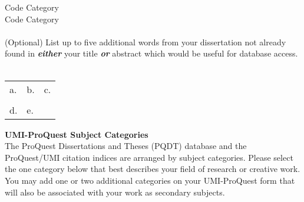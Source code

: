 \documentclass[9pt]{article}
\def\categorytwo{}
\def\codethree{}
\def\categorythree{}
\def\keyworda{}
\def\keywordb{}
\def\keywordc{}
\def\keywordd{}
\def\keyworde{}
\newcommand{\TextFieldDefault}[2][]{%
  \raisebox{\dimexpr\depth-\fontchardp\font`y}{%
    \TextField[bordercolor={},backgroundcolor={},#1]{#2}%
  }%
}
\begin{document}
\begin{Form}
\begin{enumerate}[resume]
  Code \uline{\hspace*{0.125in}\usebox{\tempfieldbox}\hspace*{0.125in}} \qquad
  \sbox{\tempfieldbox}{\TextFieldDefault[value=\categorytwo,name=category 2,width=2.375in,height=\baselineskip]{}}%
  Category \uline{\hspace*{0.125in}\usebox{\tempfieldbox}} \\
  \sbox{\tempfieldbox}{\TextFieldDefault[value=\codethree,name=code 3,width=.75in,height=\baselineskip]{}}%
  Code \uline{\hspace*{0.125in}\usebox{\tempfieldbox}\hspace*{0.125in}} \qquad
  \sbox{\tempfieldbox}{\TextFieldDefault[value=\categorythree,name=category 3,width=2.375in,height=\baselineskip]{}}%
  Category \uline{\hspace*{0.125in}\usebox{\tempfieldbox}} \\
  \\
  (Optional) List up to five additional words from your dissertation not already found in \textbf{\emph{either}} your title \textbf{\emph{or}} abstract
  which would be useful for database access. \\
  \\
  \newlength{\keywordheight}%
  \setlength{\keywordheight}{\baselineskip}%
  \begin{tabular}{lll}
    \sbox{\tempfieldbox}{\TextFieldDefault[value=\keyworda,name=keyword 1,width=1.7in,height=\keywordheight]{}}%
    a. \uline{\usebox{\tempfieldbox}} &
    \sbox{\tempfieldbox}{\TextFieldDefault[value=\keywordb,name=keyword 2,width=1.7in,height=\keywordheight]{}}%
    b. \uline{\usebox{\tempfieldbox}} &
    \sbox{\tempfieldbox}{\TextFieldDefault[value=\keywordc,name=keyword 3,width=1.7in,height=\keywordheight]{}}%
    c. \uline{\usebox{\tempfieldbox}} \\ \\
    \sbox{\tempfieldbox}{\TextFieldDefault[value=\keywordd,name=keyword 4,width=1.7in,height=\keywordheight]{}}%
    d. \uline{\usebox{\tempfieldbox}} &
    \sbox{\tempfieldbox}{\TextFieldDefault[value=\keyworde,name=keyword 5,width=1.7in,height=\keywordheight]{}}%
    e. \uline{\usebox{\tempfieldbox}} &
  \end{tabular}
\end{enumerate}
\end{Form}
\clearpage
{}
\raggedcolumns
\setlength{\parskip}{\baselineskip}
\fancyhf{}
\renewcommand{\headrulewidth}{0pt}
\rfoot{\the\numexpr\thepage-1\relax}
{\large\textbf{UMI-ProQuest Subject Categories}} \\
The ProQuest Dissertations and Theses (PQDT) database and the ProQuest/UMI citation indices are arranged by subject categories. Please select
the one category below that best describes your field of research or creative work. You may add one or two additional categories on your UMI-ProQuest
form that will also be associated with your work as secondary subjects.
\end{document}
